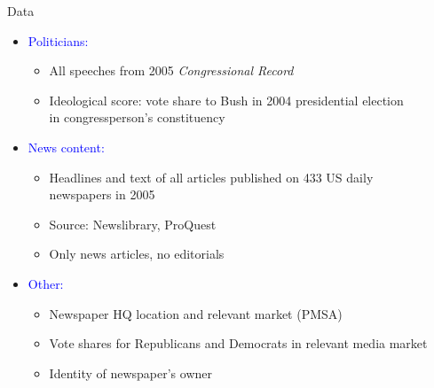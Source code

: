 \documentclass[english]{beamer}
\begin{document}
\begin{frame}{Data}
\begin{itemize}
\setlength{\itemsep}{1.2em}

\item{\textcolor{blue}{\large Politicians:}
\vspace*{5pt}
\begin{itemize}
\setlength{\itemsep}{0.5em}
\setlength{\itemindent}{-1em}
\item{All speeches from 2005 \textit{Congressional Record}}
\item{Ideological score: vote share to Bush in 2004 presidential election\\
\hspace{-10pt}in congressperson's constituency}
\end{itemize}}

\pause

\item{\textcolor{blue}{\large News content:}
\vspace*{5pt}
\begin{itemize}
\setlength{\itemsep}{0.5em}
\setlength{\itemindent}{-1em}
\item{Headlines and text of all articles published on 433 US daily\\
\hspace{-10pt}newspapers in 2005}
\item{Source: Newslibrary, ProQuest}
\item{Only news articles, no editorials}
\end{itemize}}

\pause

\item{\textcolor{blue}{\large Other:}
\vspace*{5pt}
\begin{itemize}
\setlength{\itemsep}{0.5em}
\setlength{\itemindent}{-1em}
\item{Newspaper HQ location and relevant market (PMSA)}
\item{Vote shares for Republicans and Democrats in relevant media market}
\item{Identity of newspaper's owner}
\end{itemize}}
\end{itemize}
\end{frame}
\end{document}
